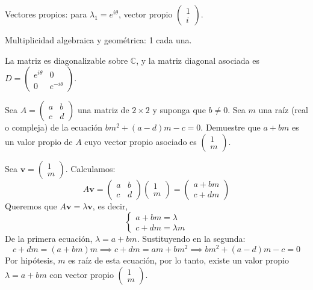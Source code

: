 \begin{prob}
\begin{enumerate}[$a)$]
\begin{myproof}
Vectores propios: para $\lambda_1 = e^{i\theta}$, vector propio $\begin{pmatrix} 1 \\ i \end{pmatrix}$.

Multiplicidad algebraica y geométrica: 1 cada una.

La matriz es diagonalizable sobre $\mathbb{C}$, y la matriz diagonal asociada es $D = \begin{pmatrix} e^{i\theta} & 0 \\ 0 & e^{-i\theta} \end{pmatrix}$.
\end{myproof}

\end{enumerate}
\end{prob}

\begin{prob}
Sea $A=\left(\begin{matrix} a&b \\ c&d \end{matrix}\right)$ una matriz de $2\times 2$ y suponga que $b\neq 0.$ Sea $m$ una raíz (real o compleja) de la ecuación $bm^2+(a-d)m-c=0.$  Demuestre que $a+bm$ es un valor propio de $A$ cuyo vector propio asociado es $\begin{pmatrix} 1\\m \end{pmatrix}.$
\begin{myproof}
Sea $\mathbf{v} = \begin{pmatrix} 1 \\ m \end{pmatrix}$. Calculamos:
\[
A\mathbf{v} = \begin{pmatrix} a & b \\ c & d \end{pmatrix} \begin{pmatrix} 1 \\ m \end{pmatrix}
= \begin{pmatrix} a + b m \\ c + d m \end{pmatrix}
\]
Queremos que $A\mathbf{v} = \lambda \mathbf{v}$, es decir,
\[
\begin{cases}
a + b m = \lambda \\
c + d m = \lambda m
\end{cases}
\]
De la primera ecuación, $\lambda = a + b m$. Sustituyendo en la segunda:
\[
c + d m = (a + b m)m \implies c + d m = a m + b m^2 \implies b m^2 + (a - d)m - c = 0
\]
Por hipótesis, $m$ es raíz de esta ecuación, por lo tanto, existe un valor propio $\lambda = a + b m$ con vector propio $\begin{pmatrix} 1 \\ m \end{pmatrix}$.
\end{myproof}
\end{prob}

